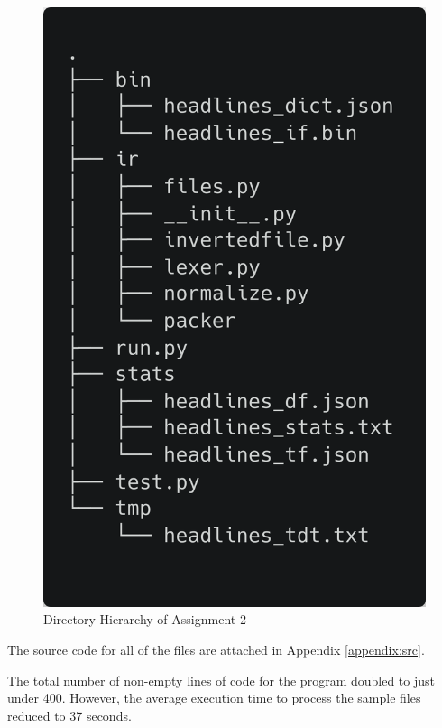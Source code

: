 \documentclass[11pt]{article}
\begin{document}
\begin{figure}[!ht]
    \centering
    \includegraphics[scale=0.2]{statics/dirtree.png}
    \caption{Directory Hierarchy of Assignment 2}
\end{figure}

The source code for all of the files are attached in Appendix \ref{appendix:src}.

The total number of non-empty lines of code for the program doubled to just under 400. However, the average execution time to process the sample files reduced to 37 seconds. 
\end{document}
